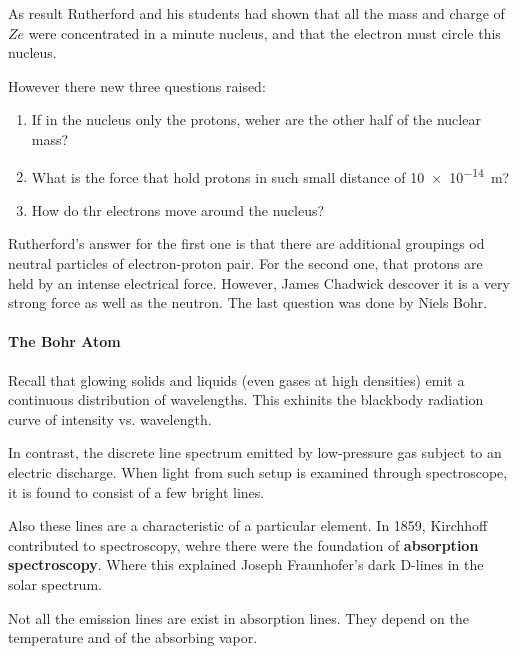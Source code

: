         \starpar As result Rutherford and his students had shown that all the mass and charge of $Ze$ were concentrated in a minute nucleus, and that the electron must 
        circle this nucleus.

        However there new three questions raised: 
        \begin{enumerate}
            \item If in the nucleus only the protons, weher are the other half of the nuclear mass?
            \item What is the force that hold protons in such small distance of \SI{10e-14}{m}?
            \item How do thr electrons move around the nucleus?
        \end{enumerate}
        Rutherford's answer for the first one is that there are additional groupings od neutral particles of electron-proton pair. For the second one, that protons are held
        by an intense electrical force. However, James Chadwick descover it is a very strong force as well as the neutron. The last question was done by Niels Bohr.

        \paragraph{The Bohr Atom} %
        \label{par:The Bohr Atom}
        Recall that glowing solids and liquids (even gases at high densities) emit a continuous distribution of wavelengths. This exhinits  the blackbody radiation curve of
        intensity vs. wavelength.

        \bulletpar In contrast, the discrete line spectrum emitted by low-pressure gas subject to an electric discharge. When light from such setup is examined through
        spectroscope, it is found to consist of a few bright lines.

        \bulletpar Also these lines are a characteristic of a particular element. In 1859, Kirchhoff contributed to spectroscopy, wehre there were the foundation of 
        \textbf{absorption spectroscopy}. Where this explained Joseph Fraunhofer's dark D-lines in the solar spectrum.

        \bulletpar Not all the emission lines are exist in absorption lines. They depend on the temperature and of the absorbing vapor.

